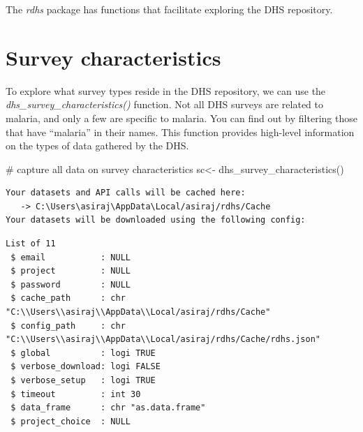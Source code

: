 \documentclass[
  letterpaper,
  DIV=11,
  numbers=noendperiod]{scrreprt}
\newenvironment{Shaded}{\begin{snugshade}}{\end{snugshade}}
\newcommand{\CommentTok}[1]{\textcolor[rgb]{0.37,0.37,0.37}{#1}}
\newcommand{\FunctionTok}[1]{\textcolor[rgb]{0.28,0.35,0.67}{#1}}
\newcommand{\NormalTok}[1]{\textcolor[rgb]{0.00,0.23,0.31}{#1}}
\newcommand{\OtherTok}[1]{\textcolor[rgb]{0.00,0.23,0.31}{#1}}
\begin{document}
The \emph{rdhs} package has functions that facilitate exploring the DHS
repository.

\section{\texorpdfstring{\textbf{Survey
characteristics}}{Survey characteristics}}\label{survey-characteristics}

To explore what survey types reside in the DHS repository, we can use
the \emph{dhs\_survey\_characteristics()} function. Not all DHS surveys
are related to malaria, and only a few are specific to malaria. You can
find out by filtering those that have ``malaria'' in their names. This
function provides high-level information on the types of data gathered
by the DHS.

\begin{Shaded}
\begin{Highlighting}[]
\CommentTok{\# capture all data on survey characteristics }
\NormalTok{sc}\OtherTok{\textless{}{-}} \FunctionTok{dhs\_survey\_characteristics}\NormalTok{()}
\end{Highlighting}
\end{Shaded}

\begin{verbatim}
Your datasets and API calls will be cached here: 
   -> C:\Users\asiraj\AppData\Local/asiraj/rdhs/Cache
Your datasets will be downloaded using the following config:
\end{verbatim}

\begin{verbatim}
List of 11
 $ email           : NULL
 $ project         : NULL
 $ password        : NULL
 $ cache_path      : chr "C:\\Users\\asiraj\\AppData\\Local/asiraj/rdhs/Cache"
 $ config_path     : chr "C:\\Users\\asiraj\\AppData\\Local/asiraj/rdhs/Cache/rdhs.json"
 $ global          : logi TRUE
 $ verbose_download: logi FALSE
 $ verbose_setup   : logi TRUE
 $ timeout         : int 30
 $ data_frame      : chr "as.data.frame"
 $ project_choice  : NULL
\end{verbatim}

\begin{verbatim}
\end{verbatim}
\end{document}
